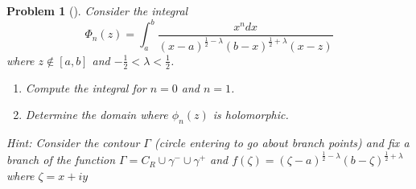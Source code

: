 \documentclass[10pt]{article}
\theoremstyle{plain}
\newtheorem{problem}{Problem}
\theoremstyle{remark}
\begin{document}
\begin{problem}[]
  Consider the integral
  \[
    \Phi_n(z) = \int_a^b \frac{x^ndx}{(x-a)^{\frac{1}{2}-\lambda} (b-x)^{\frac{1}{2}+ \lambda} (x-z)}
  \]
  where $z \notin [a,b]$ and $-\frac{1}{2} < \lambda < \frac{1}{2}$.
  
  \begin{enumerate}
  \item[(a)] Compute the integral for $n= 0$ and $n=1$.
  \item[(b)] Determine the domain where $\phi_n(z)$ is holomorphic.
  \end{enumerate}
  
  Hint: Consider the contour $\Gamma$ (circle entering to go about branch points) and fix a
  branch of the function $\Gamma = C_R \cup \gamma^- \cup \gamma^+$ and
  $f(\zeta) = (\zeta - a)^{\frac{1}{2} - \lambda}(b- \zeta) ^{\frac{1}{2} + \lambda}$
  where $\zeta = x+ iy$
\end{problem}
\end{document}
